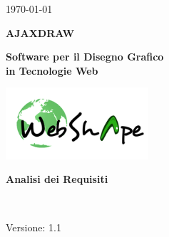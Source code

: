 \usepackage{multirow}


\renewcommand{\insertversion}{1.1} %
\renewcommand{\TITOLODOC}{Analisi dei Requisiti} %

\begin{titlepage}
\begin{center}
	\begin{Large}	\today \end{Large}
\end{center}

\vspace{20pt}

\begin{center}
	\begin{Huge}
				\textbf{AJAXDRAW}
	\end{Huge}
\end{center}			

\begin{center}
	\begin{large}
				\textbf{Software per il Disegno Grafico\\ in Tecnologie Web}
	\end{large}
\end{center}			

\vspace{20pt}

\begin{center}
\includegraphics[width=150pt]{../logo/logo}
\end{center}

\vspace{160pt}
\begin{center} %
	\begin{Huge}
				\textbf{\TITOLODOC}
	\end{Huge}
			\\
\end{center}
\vspace{220pt}
\begin{center}
Versione: \insertversion
\end{center}
\end{titlepage}

